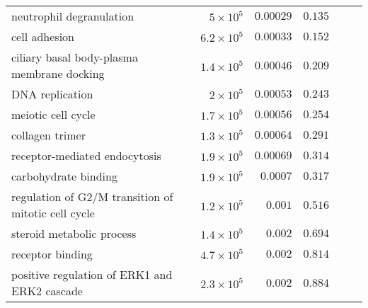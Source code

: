 \begin{longtable}{|l|r|r|r|r|r|}
    neutrophil degranulation                            & $ 5\times 10^{5}$  & $0.00029$            & $ 0.135~~$                                               \\
    cell adhesion                                       & $6.2\times 10^{5}$ & $0.00033$            & $ 0.152~~$                                               \\
    ciliary basal body-plasma membrane docking          & $1.4\times 10^{5}$ & $0.00046$            & $ 0.209~~$                                               \\
    DNA replication                                     & $ 2\times 10^{5}$  & $0.00053$            & $ 0.243~~$                                               \\
    meiotic cell cycle                                  & $1.7\times 10^{5}$ & $0.00056$            & $ 0.254~~$                                               \\
    collagen trimer                                     & $1.3\times 10^{5}$ & $0.00064$            & $ 0.291~~$                                               \\
    receptor-mediated endocytosis                       & $1.9\times 10^{5}$ & $0.00069$            & $ 0.314~~$                                               \\
    carbohydrate binding                                & $1.9\times 10^{5}$ & $0.0007$             & $ 0.317~~$                                               \\
    regulation of G2/M transition of mitotic cell cycle & $1.2\times 10^{5}$ & $ 0.001$             & $ 0.516~~$                                               \\
    steroid metabolic process                           & $1.4\times 10^{5}$ & $ 0.002$             & $ 0.694~~$                                               \\
    receptor binding                                    & $4.7\times 10^{5}$ & $ 0.002$             & $ 0.814~~$                                               \\
    positive regulation of ERK1 and ERK2 cascade        & $2.3\times 10^{5}$ & $ 0.002$             & $ 0.884~~$                                               \\
\end{longtable}
